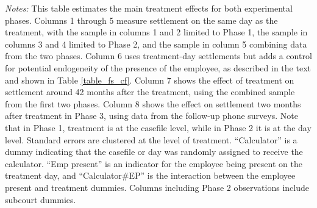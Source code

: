 \documentclass[11pt, a4paper]{article}
\begin{document}
\begin{landscape}
\begin{table}[!ht]
    \caption{Effect of Treatment on Settlement}
    \label{Treatment_effects}
    \begin{center}
    \scriptsize{}
    \end{center}
\scriptsize
\textit{Notes:}  This table estimates the main treatment effects for both experimental phases. Columns 1 through 5 measure settlement on the same day as the treatment, with the sample in columns 1 and 2 limited to Phase 1, the sample in columns 3 and 4 limited to Phase 2, and the sample in column 5 combining data from the two phases.  Column 6 uses treatment-day settlements but adds a control for potential endogeneity of the presence of the employee, as described in the text and shown in Table \ref{table_fs_cf}. Column 7 shows the effect of treatment on settlement around 42 months after the treatment, using the combined sample from the first two phases. Column 8 shows the effect on settlement two months after treatment in Phase 3, using data from the follow-up phone surveys.  Note that in Phase 1, treatment is at the casefile level, while in Phase 2 it is at the day level. Standard errors are clustered at the level of treatment. ``Calculator'' is a dummy indicating that the casefile or day was randomly assigned to receive the calculator. ``Emp present'' is an indicator for the employee being present on the treatment day, and ``Calculator\#EP'' is the interaction between the employee present and treatment dummies. Columns including Phase 2 observations include subcourt dummies. 
\end{table}
\end{landscape}
\end{document}
